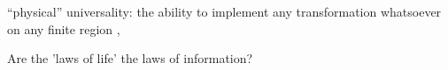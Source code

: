 \documentclass[]{article}
\begin{document}
“physical” universality: the ability to implement any transformation whatsoever on any finite region \cite{janzing2010there}, \cite{schaeffer2014physicallyuniversal}

Are the ’laws of life’  the laws of information?

\printglossaries

 


\end{document}
